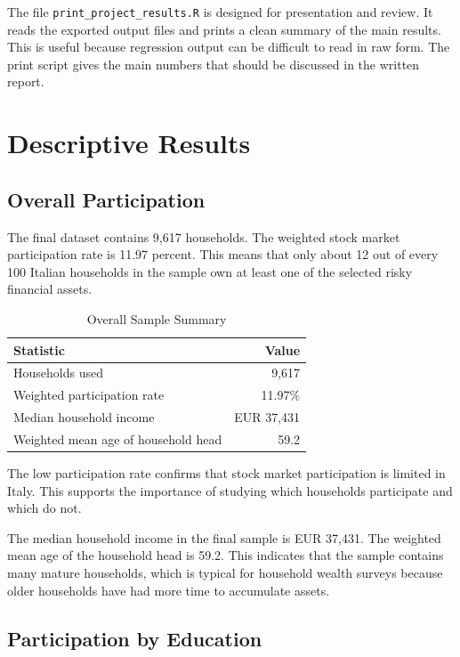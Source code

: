 \documentclass[12pt]{article}
\begin{document}
The file \texttt{print\_project\_results.R} is designed for presentation and review. It reads the exported output files and prints a clean summary of the main results. This is useful because regression output can be difficult to read in raw form. The print script gives the main numbers that should be discussed in the written report.

\section{Descriptive Results}

\subsection{Overall Participation}

The final dataset contains 9,617 households. The weighted stock market participation rate is 11.97 percent. This means that only about 12 out of every 100 Italian households in the sample own at least one of the selected risky financial assets.

\begin{table}[H]
\centering
\caption{Overall Sample Summary}
\begin{tabular}{lr}
\toprule
\textbf{Statistic} & \textbf{Value} \\
\midrule
Households used & 9,617 \\
Weighted participation rate & 11.97\% \\
Median household income & EUR 37,431 \\
Weighted mean age of household head & 59.2 \\
\bottomrule
\end{tabular}
\end{table}

The low participation rate confirms that stock market participation is limited in Italy. This supports the importance of studying which households participate and which do not.

The median household income in the final sample is EUR 37,431. The weighted mean age of the household head is 59.2. This indicates that the sample contains many mature households, which is typical for household wealth surveys because older households have had more time to accumulate assets.

\subsection{Participation by Education}
\end{document}
